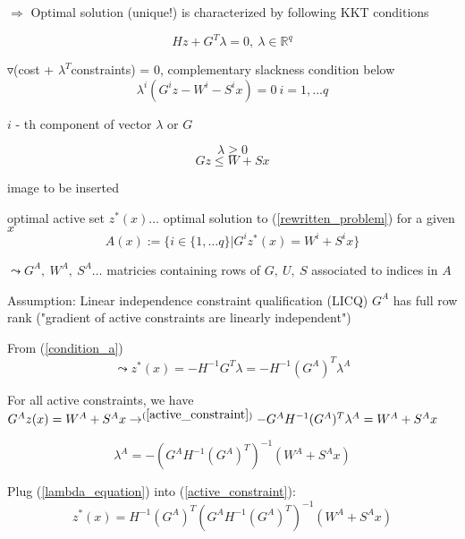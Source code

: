 $\Rightarrow$ Optimal solution (unique!) is characterized by following KKT conditions

\begin{equation}\label{condition_a}
Hz + G^T\lambda = 0, \ \lambda \in \mathbb{R}^q
\end{equation}

$\triangledown$(cost + $\lambda^T$constraints) = 0, complementary slackness condition below
\begin{equation}\label{condition_b}
\lambda^i(G^iz - W^i-S^ix) = 0 \ i=1, ...q
\end{equation}

$i$ - th component of vector $\lambda$ or $G$

\begin{equation}\label{condition_c}
\lambda \geq 0
\end{equation}
\begin{equation}\label{condition_d}
Gz \leq W + Sx
\end{equation}

image to be inserted

\begin{Definition}
optimal active set $z^*(x) \dots$ optimal solution to (\ref{rewritten_problem}) for a given $x$
\begin{equation*}
A(x) := \{ i \in \{1, \dots q\} | G^iz^*(x) = W^i + S^ix \}
\end{equation*}

$\leadsto G^A, \ W^A, \ S^A \dots$ matricies containing rows of $G, \ U, \ S$ associated to indices in $A$ 
\end{Definition}

Assumption: Linear independence constraint qualification (LICQ) $G^A$ has full row rank ("gradient of active constraints are linearly independent")

From (\ref{condition_a}) 
\begin{equation}\label{active_constraint}
\leadsto z^*(x) = -H^{-1}G^T\lambda = -H^{-1}(G^A)^T\lambda^A
\end{equation}

For all active constraints, we have $G^Az(x) = W^A + S^Ax \to^{(\ref{active_constraint})} - G^AH^{-1}(G^A)^T\lambda^A = W^A+S^Ax$

\begin{equation}\label{lambda_equation}
\lambda^A = - (G^AH^{-1}(G^A)^T)^{-1}(W^A+S^Ax)
\end{equation} 

Plug (\ref{lambda_equation}) into (\ref{active_constraint}):
\begin{equation}\label{optimal_z}
z^*(x) = H^{-1}(G^A)^T(G^AH^{-1}(G^A)^T)^{-1}(W^A + S^Ax)
\end{equation}

